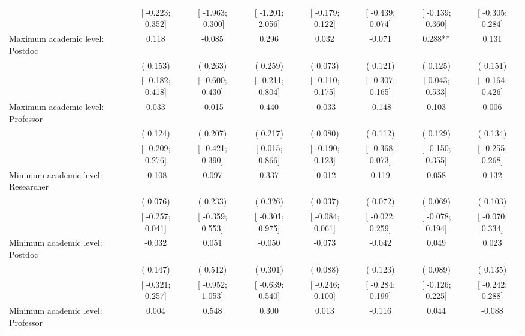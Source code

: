 \begin{tabular}{l*{7}{c}}
                    &[   -0.223;     0.352]   &[   -1.963;    -0.300]   &[   -1.201;     2.056]   &[   -0.179;     0.122]   &[   -0.439;     0.074]   &[   -0.139;     0.360]   &[   -0.305;     0.284]   \\
Maximum academic level: Postdoc &    0.118   &   -0.085   &    0.296   &    0.032   &   -0.071   &    0.288**   &    0.131   \\
                    &(    0.153)   &(    0.263)   &(    0.259)   &(    0.073)   &(    0.121)   &(    0.125)   &(    0.151)   \\
                    &[   -0.182;     0.418]   &[   -0.600;     0.430]   &[   -0.211;     0.804]   &[   -0.110;     0.175]   &[   -0.307;     0.165]   &[    0.043;     0.533]   &[   -0.164;     0.426]   \\
Maximum academic level: Professor &    0.033   &   -0.015   &    0.440   &   -0.033   &   -0.148   &    0.103   &    0.006   \\
                    &(    0.124)   &(    0.207)   &(    0.217)   &(    0.080)   &(    0.112)   &(    0.129)   &(    0.134)   \\
                    &[   -0.209;     0.276]   &[   -0.421;     0.390]   &[    0.015;     0.866]   &[   -0.190;     0.123]   &[   -0.368;     0.073]   &[   -0.150;     0.355]   &[   -0.255;     0.268]   \\
Minimum academic level: Researcher &   -0.108   &    0.097   &    0.337   &   -0.012   &    0.119   &    0.058   &    0.132   \\
                    &(    0.076)   &(    0.233)   &(    0.326)   &(    0.037)   &(    0.072)   &(    0.069)   &(    0.103)   \\
                    &[   -0.257;     0.041]   &[   -0.359;     0.553]   &[   -0.301;     0.975]   &[   -0.084;     0.061]   &[   -0.022;     0.259]   &[   -0.078;     0.194]   &[   -0.070;     0.334]   \\
Minimum academic level: Postdoc &   -0.032   &    0.051   &   -0.050   &   -0.073   &   -0.042   &    0.049   &    0.023   \\
                    &(    0.147)   &(    0.512)   &(    0.301)   &(    0.088)   &(    0.123)   &(    0.089)   &(    0.135)   \\
                    &[   -0.321;     0.257]   &[   -0.952;     1.053]   &[   -0.639;     0.540]   &[   -0.246;     0.100]   &[   -0.284;     0.199]   &[   -0.126;     0.225]   &[   -0.242;     0.288]   \\
Minimum academic level: Professor &    0.004   &    0.548   &    0.300   &    0.013   &   -0.116   &    0.044   &   -0.088   \\

\end{tabular}
